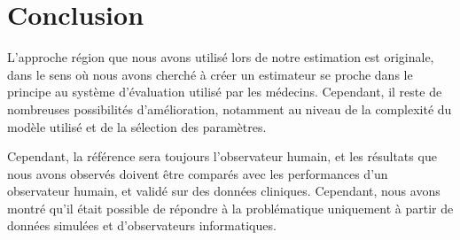 



\section{Conclusion}

L'approche région que nous avons utilisé lors de notre estimation est originale, dans le sens où nous avons cherché à créer un estimateur se proche dans le principe au système d'évaluation utilisé par les médecins. Cependant, il reste de nombreuses possibilités d'amélioration, notamment au niveau de la complexité du modèle utilisé et de la sélection des paramètres.

Cependant, la référence sera toujours l'observateur humain, et les résultats que nous avons observés doivent être comparés avec les performances d'un observateur humain, et validé sur des données cliniques. Cependant, nous avons montré qu'il était possible de répondre à la problématique uniquement à partir de données simulées et d'observateurs informatiques.
